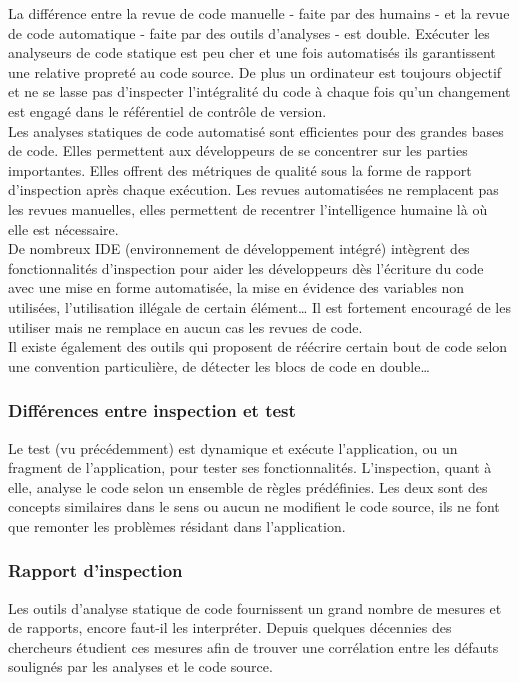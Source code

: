     La différence entre la revue de code manuelle - faite par des humains - et la revue de code automatique - faite par des outils d’analyses - est double. Exécuter les analyseurs de code statique est peu cher et une fois automatisés ils garantissent une relative propreté au code source. De plus un ordinateur est toujours objectif et ne se lasse pas d’inspecter l’intégralité du code à chaque fois qu’un changement est engagé dans le référentiel de contrôle de version.\\

    Les analyses statiques de code automatisé sont efficientes pour des grandes bases de code. Elles permettent aux développeurs de se concentrer sur les parties importantes. Elles offrent des métriques de qualité sous la forme de rapport d’inspection après chaque exécution. Les revues automatisées ne remplacent pas les revues manuelles, elles permettent de recentrer l’intelligence humaine là où elle est nécessaire.\\

    De nombreux IDE (environnement de développement intégré) intègrent des fonctionnalités d’inspection pour aider les développeurs dès l’écriture du code avec une mise en forme automatisée, la mise en évidence des variables non utilisées, l’utilisation illégale de certain élément… Il est fortement encouragé de les utiliser mais ne remplace en aucun cas les revues de code.\\

    Il existe également des outils qui proposent de réécrire certain bout de code selon une convention particulière, de détecter les blocs de code en double…

      \subsubsection{Différences entre inspection et test}
      Le test (vu précédemment) est dynamique et exécute l’application, ou un fragment de l’application, pour tester ses fonctionnalités. L’inspection, quant à elle, analyse le code selon un ensemble de règles prédéfinies. Les deux sont des concepts similaires dans le sens ou aucun ne modifient le code source, ils ne font que remonter les problèmes résidant dans l’application.

      \subsubsection{Rapport d’inspection}
      Les outils d’analyse statique de code fournissent un grand nombre de mesures et de rapports, encore faut-il les interpréter. Depuis quelques décennies des chercheurs étudient ces mesures afin de trouver une corrélation entre les défauts soulignés par les analyses et le code source.\\

